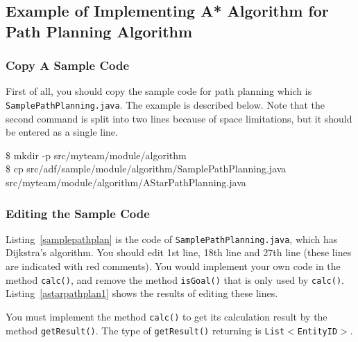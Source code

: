 \documentclass{article}
\begin{document}
\subsection{Example of Implementing A* Algorithm for Path Planning Algorithm}
\subsubsection{Copy A Sample Code}
First of all, you should copy the sample code for path planning which is \texttt{SamplePathPlanning.java}. The example is described below. Note that the second command is split into two lines because of space limitations, but it should be entered as a single line.
\begin{center}
   \begin{tcolorbox}[title=Copy the Sample Path Planning, width=.98\linewidth]
    {\ttfamily
    \$ mkdir -p src/myteam/module/algorithm\\
    \$ cp src/adf/sample/module/algorithm/SamplePathPlanning.java src/myteam/module/algorithm/AStarPathPlanning.java
    }
  \end{tcolorbox}
\end{center}
\subsubsection{Editing the Sample Code}
Listing~\ref{samplepathplan} is the code of \texttt{SamplePathPlanning.java},
which has Dijkstra's algorithm. You should edit 1st line, 18th line and 27th line (these lines are indicated with red comments). You would implement your own code in the method \texttt{calc()}, and remove the method \texttt{isGoal()} that is only used by \texttt{calc()}. Listing~\ref{astarpathplan1} shows the results of editing these lines.

You must implement the method \texttt{calc()} to get its calculation result
by the method \texttt{getResult()}. The type of \texttt{getResult()} returning is \texttt{List$<$EntityID$>$}.
\end{document}
